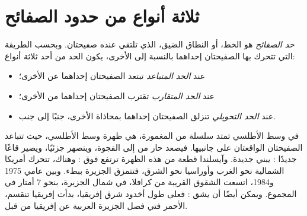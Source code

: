\section{ثلاثة أنواع من حدود الصفائح}

\begin{definition}[حد الصفائح]\label{def:g7:plate-tectonics:plate-boundary}
\emph{حد الصفائح} هو الخط، أو النطاق
الضيق، الذي تلتقي عنده صفيحتان. وبحسب الطريقة التي تتحرك بها الصفيحتان
إحداهما بالنسبة إلى الأخرى، يكون الحد من أحد ثلاثة أنواع:
\begin{itemize}
  \item عند \emph{الحد المتباعد} تبتعد
        الصفيحتان إحداهما عن الأخرى؛
  \item عند \emph{الحد المتقارب} تقترب
        الصفيحتان إحداهما من الأخرى؛
  \item عند \emph{الحد التحويلي} تنزلق
        الصفيحتان إحداهما بمحاذاة الأخرى، جنبًا إلى جنب.
\end{itemize}
\end{definition}

\begin{example}\label{ex:g7:plate-tectonics:divergent}
في وسط  الأطلسي تمتد سلسلة من  المغمورة،
هي ظهرة وسط الأطلسي، حيث تتباعد الصفيحتان الواقعتان على جانبيها. فيصعد 
حار من  إلى الفجوة، وينصهر جزئيًا، ويصير قاعًا جديدًا
:  يبني  جديدة. وآيسلندا قطعة من
هذه الظهرة ترتفع فوق : وهناك، تتحرك أمريكا الشمالية نحو الغرب
وأوراسيا نحو الشرق، فتتمزق الجزيرة ببطء. وبين عامي 1975
و1984، اتسعت الشقوق القريبة من  كرافلا، في شمال الجزيرة،
بنحو 7 أمتار في المجموع. ويمكن  أيضًا أن يشق
: فعلى طول أخدود شرق إفريقيا، بدأت إفريقيا تنقسم،
 الأحمر  فتي فصل الجزيرة العربية عن
إفريقيا من قبل.
\end{example}

